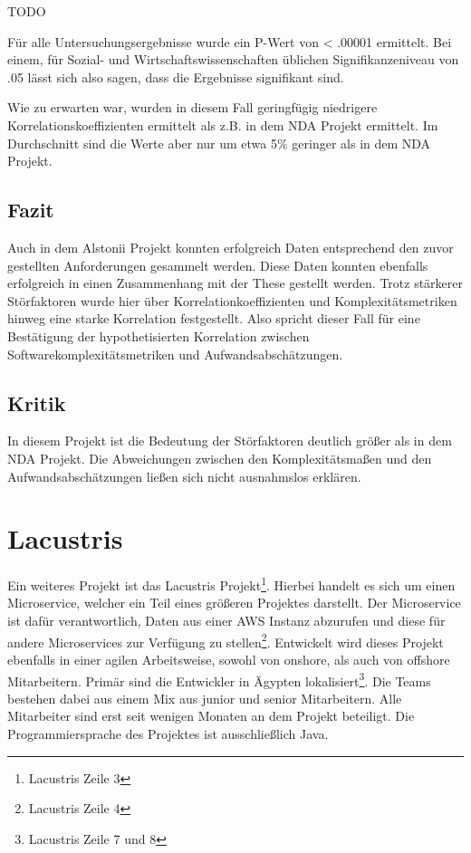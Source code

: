 TODO

Für alle Untersuchungsergebnisse wurde ein P-Wert von \textless{} .00001
ermittelt.
Bei einem, für Sozial- und Wirtschaftswissenschaften üblichen
Signifikanzeniveau von .05 lässt sich also sagen, dass die Ergebnisse
signifikant sind.

Wie zu erwarten war, wurden in diesem Fall geringfügig niedrigere
Korrelationskoeffizienten ermittelt als z.B. in dem \ac{NDA} Projekt
ermittelt. Im Durchschnitt sind die Werte aber nur um etwa 5\% geringer
als in dem \ac{NDA} Projekt.

\subsection{Fazit}\label{Alstonii-fazit}

Auch in dem Alstonii Projekt konnten erfolgreich Daten entsprechend
den zuvor gestellten Anforderungen gesammelt werden. Diese Daten konnten
ebenfalls erfolgreich in einen Zusammenhang mit der These gestellt
werden. Trotz stärkerer Störfaktoren wurde hier über
Korrelationkoeffizienten und Komplexitätsmetriken hinweg eine starke
Korrelation festgestellt. Also spricht dieser Fall für eine Bestätigung
der hypothetisierten Korrelation zwischen Softwarekomplexitätsmetriken
und Aufwandsabschätzungen.

\subsection{Kritik}\label{Alstonii-kritik}

In diesem Projekt ist die Bedeutung der Störfaktoren deutlich grö\ss er als
in dem NDA Projekt. Die Abweichungen zwischen den Komplexitätsma\ss en und
den Aufwandsabschätzungen lie\ss en sich nicht ausnahmslos erklären.

\section{Lacustris}\label{lacustris}

Ein weiteres Projekt ist das Lacustris Projekt\footnote{Lacustris
  Zeile 3}. Hierbei handelt es sich um einen Microservice, welcher ein
Teil eines grö\ss eren Projektes darstellt. Der Microservice ist dafür
verantwortlich, Daten aus einer \ac{AWS} Instanz abzurufen und diese für
andere Microservices zur Verfügung zu stellen\footnote{Lacustris Zeile 4}.
Entwickelt wird dieses Projekt ebenfalls in einer agilen Arbeitsweise,
sowohl von onshore, als auch von offshore Mitarbeitern. Primär sind die
Entwickler in Ägypten lokalisiert\footnote{Lacustris Zeile 7 und 8}. Die
Teams bestehen dabei aus einem Mix aus junior und senior Mitarbeitern.
Alle Mitarbeiter sind erst seit wenigen Monaten an dem Projekt
beteiligt. Die Programmiersprache des Projektes ist ausschlie\ss lich Java.

